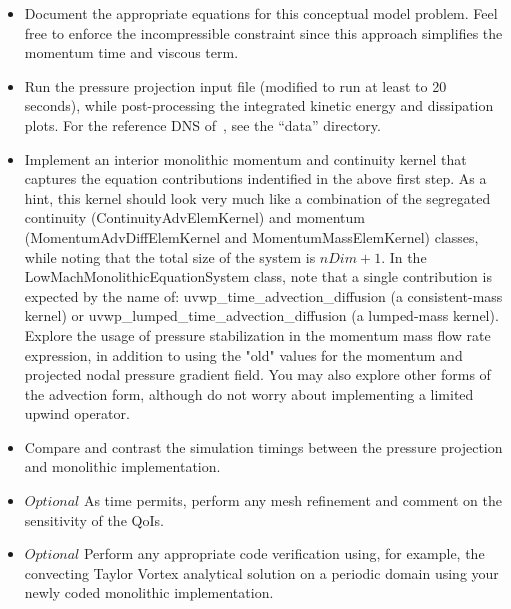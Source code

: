 \documentclass{article}
\begin{document}
\begin{itemize}
	\item Document the appropriate equations for this conceptual model problem. Feel free to enforce the incompressible
          	constraint since this approach simplifies the momentum time and viscous term.
	\item Run the pressure projection input file (modified to run at least to 20 seconds), while post-processing the integrated 
		kinetic energy and dissipation plots. For the reference DNS of~\cite{hillewaert2012}, see the ``data''  directory.
        \item Implement an interior monolithic momentum and continuity kernel that captures the equation contributions indentified 
        		in the above first step. As a hint, this kernel should look 
          	very much like a combination of the segregated continuity (ContinuityAdvElemKernel) 
          	and momentum (MomentumAdvDiffElemKernel and MomentumMassElemKernel) classes, while noting that the total 
		size of the system is $nDim+1$.  In the LowMachMonolithicEquationSystem class, note that a single contribution is expected 
		by the name of: uvwp\_time\_advection\_diffusion (a consistent-mass kernel) or uvwp\_lumped\_time\_advection\_diffusion 
		(a lumped-mass kernel). Explore the usage of pressure stabilization in the momentum mass flow rate expression, in addition 
		to using the "old" values for the momentum and projected nodal pressure gradient field. You may also explore other forms of the
		advection form, although do not worry about implementing a limited upwind operator.
	\item Compare and contrast the simulation timings between the pressure projection and monolithic implementation. 
	\item $Optional$ As time permits, perform any mesh refinement and comment on the sensitivity of the QoIs.
	\item $Optional$ Perform any appropriate code verification using, for example, the convecting Taylor Vortex analytical solution
		on a periodic domain using your newly coded monolithic implementation.		
\end{itemize}




\end{document}
